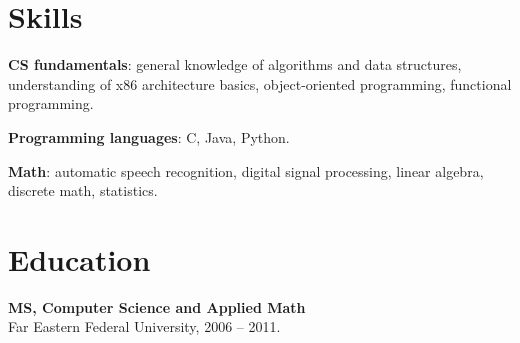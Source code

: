\documentclass[11pt,a4paper]{article}
\begin{document}
\section{Skills}
\begin{multicols}{2}
  \raggedcolumns
  \begin{items}
  \item \textbf{CS fundamentals}: general knowledge of algorithms and
    data structures, understanding of x86 architecture basics,
    object-oriented programming, functional programming.

    \columnbreak

  \item \textbf{Programming languages}: C, %
    Java, Python.
  \item \textbf{Math}: automatic speech recognition, digital signal processing,
    linear algebra, discrete math, statistics.
  \end{items}
\end{multicols}

\section{Education}
\begin{multicols}{2}
  \raggedcolumns
  \begin{items}
  \item \textbf{MS, Computer Science and Applied Math}\\
    Far Eastern Federal University, 2006 -- 2011.
  \end{items}
  \columnbreak
  \hspace{10mm}
\end{multicols}

\end{document}
